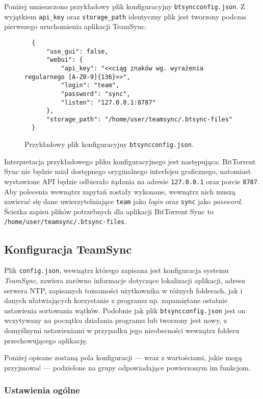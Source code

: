 Poniżej umieszczono przykładowy plik konfiguracyjny \texttt{btsyncconfig.json}. Z wyjątkiem \texttt{api\_key} oraz \texttt{storage\_path} identyczny plik jest tworzony podczas pierwszego uruchomienia aplikacji TeamSync.

\begin{figure}[htb]
  \begin{verbatim}
  {
      "use_gui": false, 
      "webui": {
          "api_key": "<<ciąg znaków wg. wyrażenia regularnego [A-Z0-9]{136}>>", 
          "login": "team", 
          "password": "sync", 
          "listen": "127.0.0.1:8787"
      }, 
      "storage_path": "/home/user/teamsync/.btsync-files"
  }
  \end{verbatim}
  \caption{Przykładowy plik konfiguracyjny \texttt{btsyncconfig.json}.}
\end{figure}

Interpretacja przykładowego pliku konfiguracyjnego jest następująca: BitTorrent Sync nie będzie miał dostępnego oryginalnego interfejsu graficznego, natomiast wystawione API będzie odbierało żądania na adresie \texttt{127.0.0.1} oraz porcie \texttt{8787}. Aby polecenia wewnątrz zapytań zostały wykonane, wewnątrz nich muszą zawierać się dane uwierzytelniające \texttt{team} jako \emph{login} oraz \texttt{sync} jako \emph{password}. Ścieżka zapisu plików potrzebnych dla aplikacji BitTorrent Sync to \texttt{/home/user/\-teamsync/.btsync-files}.

\subsection{Konfiguracja TeamSync}

\label{configteamsync}

Plik \texttt{config.json}, wewnątrz którego zapisana jest konfiguracja systemu \emph{TeamSync}, zawiera zarówno informacje dotyczące lokalizacji aplikacji, adresu serwera NTP, zapisanych tożsamości użytkownika w różnych folderach, jak i danych ułatwiających korzystanie z programu np. zapamiętane ostatnie ustawienia sortowania wątków. Podobnie jak plik \texttt{btsyncconfig.json} jest on wczytywany na początku działania programu lub tworzony jest nowy, z domyślnymi ustawieniami w przypadku jego nieobecności wewnątrz folderu przechowującego aplikację.

Poniżej opisane zostaną pola konfiguracji --- wraz z wartościami, jakie mogą przyjmować --- podzielone na grupy odpowiadające powierzonym im funkcjom.

\subsubsection*{Ustawienia ogólne}

